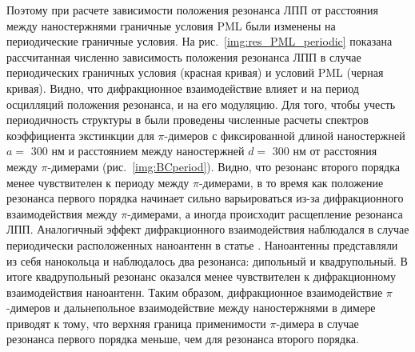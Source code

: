 Поэтому при расчете зависимости положения резонанса ЛПП от расстояния между наностержнями граничные условия PML были изменены на периодические граничные условия. На рис.~\ref{img:res_PML_periodic} показана рассчитанная численно зависимость положения резонанса ЛПП в случае периодических граничных условия (красная кривая) и условий PML (черная кривая). Видно, что дифракционное взаимодействие влияет и на период осцилляций положения резонанса, и на его модуляцию.
Для того, чтобы учесть периодичность структуры в были проведены численные расчеты спектров коэффициента экстинкции для $ \pi $-димеров с фиксированной длиной наностержней $ a = $ 300 нм и расстоянием между наностержней $ d = $ 300 нм от расстояния между $ \pi $-димерами (рис.~\ref{img:BCperiod}). Видно, что резонанс второго порядка менее чувствителен к периоду между $ \pi $-димерами, в то время как положение резонанса первого порядка начинает сильно варьироваться из-за дифракционного взаимодействия между $ \pi $-димерами, а иногда происходит расщепление резонанса ЛПП. Аналогичный эффект дифракционного взаимодействия наблюдался в случае периодически расположенных наноантенн в статье \cite{diffractionCoupling}. Наноантенны представляли из себя нанокольца и наблюдалось два резонанса: дипольный и квадрупольный. В итоге квадрупольный резонанс оказался менее чувствителен к дифракционному взаимодействия наноантенн.
Таким образом, дифракционное взаимодействие $ \pi $-димеров и дальнепольное взаимодействие между наностержнями в димере приводят к тому, что верхняя граница применимости $ \pi $-димера в случае резонанса первого порядка меньше, чем для резонанса второго порядка.
